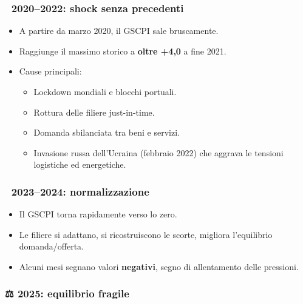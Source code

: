 \documentclass[
  11pt,
  letterpaper,
  DIV=11,
  numbers=noendperiod]{scrartcl}
\providecommand{\tightlist}{%
  \setlength{\itemsep}{0pt}\setlength{\parskip}{0pt}}
\begin{document}
\subsubsection{\texorpdfstring{🔺 \textbf{2020--2022: shock senza
precedenti}}{🔺 2020--2022: shock senza precedenti}}\label{shock-senza-precedenti}

\begin{itemize}
\item
  A partire da marzo 2020, il GSCPI sale bruscamente.
\item
  Raggiunge il massimo storico a \textbf{oltre +4,0} a fine 2021.
\item
  Cause principali:

  \begin{itemize}
  \tightlist
  \item
    Lockdown mondiali e blocchi portuali.
  \item
    Rottura delle filiere just-in-time.
  \item
    Domanda sbilanciata tra beni e servizi.
  \item
    Invasione russa dell'Ucraina (febbraio 2022) che aggrava le tensioni
    logistiche ed energetiche.
  \end{itemize}
\end{itemize}

\subsubsection{\texorpdfstring{🔻 \textbf{2023--2024:
normalizzazione}}{🔻 2023--2024: normalizzazione}}\label{normalizzazione}

\begin{itemize}
\tightlist
\item
  Il GSCPI torna rapidamente verso lo zero.
\item
  Le filiere si adattano, si ricostruiscono le scorte, migliora
  l'equilibrio domanda/offerta.
\item
  Alcuni mesi segnano valori \textbf{negativi}, segno di allentamento
  delle pressioni.
\end{itemize}

\subsubsection{\texorpdfstring{⚖️ \textbf{2025: equilibrio
fragile}}{⚖️ 2025: equilibrio fragile}}\label{equilibrio-fragile}
\end{document}

